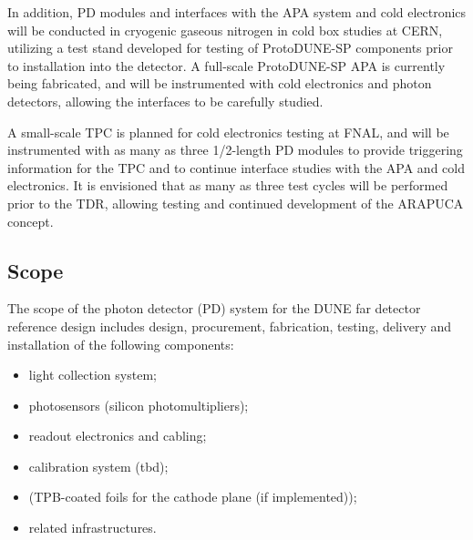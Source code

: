
In addition, PD modules and interfaces with the APA system and cold electronics will be conducted in cryogenic gaseous nitrogen in cold box studies at CERN, utilizing a test stand developed for testing of ProtoDUNE-SP components prior to installation into the detector.  A full-scale ProtoDUNE-SP APA is currently being fabricated, and will be instrumented with cold electronics and photon detectors, allowing the interfaces to be carefully studied.

A small-scale TPC is planned for cold electronics testing at FNAL, and will be instrumented with as many as three 1/2-length PD modules to provide triggering information for the TPC and to continue interface studies with the APA and cold electronics.  It is envisioned that as many as three test cycles will be performed prior to the TDR, allowing testing and continued development of the ARAPUCA concept.


\subsection{Scope}
\label{sec:fdsp-pd-scope}

The scope of the photon detector (PD) system for the DUNE far detector 
reference design includes design, procurement, fabrication, testing,
 delivery and installation of the following components:
\begin{itemize}
        \item light collection system;
        \item photosensors (silicon photomultipliers);
        \item readout electronics and cabling;
        \item calibration system (tbd);
        \item (TPB-coated foils for the cathode plane (if implemented));
        \item related infrastructures.
\end{itemize}